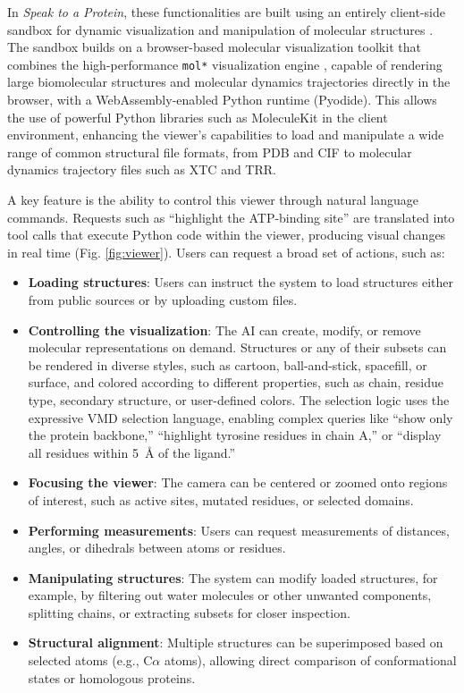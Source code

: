 \documentclass{article}
\begin{document}
In \emph{Speak to a Protein}, these functionalities are built using an entirely client-side sandbox for dynamic visualization and manipulation of molecular structures \citep{torrens2023playmolecule}. The sandbox builds on a browser-based molecular visualization toolkit that combines the high-performance \texttt{mol*} visualization engine \citep{Sehnal2021},  capable of rendering large biomolecular structures and molecular dynamics trajectories directly in the browser, with a WebAssembly-enabled Python runtime (Pyodide). This allows the use of powerful Python libraries such as MoleculeKit \citep{Doerr2016} in the client environment, enhancing the viewer's capabilities to load and manipulate a wide range of common structural file formats, from PDB and CIF to molecular dynamics trajectory files such as XTC and TRR. 


A key feature is the ability to control this viewer through natural language commands. Requests such as “highlight the ATP-binding site” are translated into tool calls that execute Python code within the viewer, producing visual changes in real time (Fig. \ref{fig:viewer}). Users can request a broad set of actions, such as:
\begin{itemize}[leftmargin=1em]
    \item \textbf{Loading structures}: Users can instruct the system to load structures either from public sources or by uploading custom files.
    \item \textbf{Controlling the visualization}: The AI can create, modify, or remove molecular representations on demand. Structures or any of their subsets can be rendered in diverse styles, such as cartoon, ball-and-stick, spacefill, or surface, and colored according to different properties, such as chain, residue type, secondary structure, or user-defined colors. The selection logic uses the expressive VMD selection language, enabling complex queries like “show only the protein backbone,” “highlight tyrosine residues in chain A,” or “display all residues within 5~\AA{} of the ligand.”
    \item \textbf{Focusing the viewer}: The camera can be centered or zoomed onto regions of interest, such as active sites, mutated residues, or selected domains.
    \item \textbf{Performing measurements}: Users can request measurements of distances, angles, or dihedrals between atoms or residues.
    \item \textbf{Manipulating structures}: The system can modify loaded structures, for example, by filtering out water molecules or other unwanted components, splitting chains, or extracting subsets for closer inspection.
    \item \textbf{Structural alignment}: Multiple structures can be superimposed based on selected atoms (e.g., C$\alpha$ atoms), allowing direct comparison of conformational states or homologous proteins.    

\end{itemize}
\end{document}
